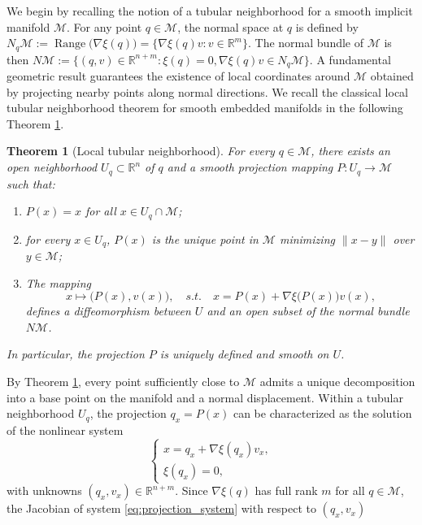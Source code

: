 \documentclass[12pt]{article}
\newtheorem{theorem}{Theorem}[section]
\begin{document}
We begin by recalling the notion of a tubular neighborhood for a smooth implicit
manifold $\mathcal{M}$.
For any point $q \in \mathcal{M}$, the normal space at $q$ is defined by
\(
N_q \mathcal{M}
:= \operatorname{Range}\bigl(\nabla \xi(q)\bigr)
= \{ \nabla \xi(q) v : v \in \mathbb{R}^m \}.
\)
The normal bundle of $\mathcal{M}$ is then
\(
N \mathcal{M}
:= \{ (q, v) \in \mathbb{R}^{n+m} : \xi(q) = 0,\nabla\xi(q)v \in N_q \mathcal{M} \}.
\)
A fundamental geometric result guarantees the existence of local coordinates
around $\mathcal{M}$ obtained by projecting nearby points along normal directions.
We recall the classical local tubular neighborhood theorem \citep{J19} for smooth embedded
manifolds in the following Theorem \ref{thm:tubular_local}.
\begin{theorem}[Local tubular neighborhood]
\label{thm:tubular_local}
For every $q \in \mathcal{M}$, there exists an open neighborhood
$U_q \subset \mathbb{R}^n$ of $q$ and a smooth projection mapping
\(
P : U_q \to \mathcal{M}
\)
such that:
\begin{enumerate}
    \item[(i)] $P(x) = x$ for all $x \in U_q \cap \mathcal{M}$;
    \item[(ii)] for every $x \in U_q$, $P(x)$ is the unique point in $\mathcal{M}$ minimizing
    $\|x - y\|$ over $y \in \mathcal{M}$;
    \item[(iii)]  The mapping
\[
x \longmapsto \bigl(P(x), v(x)\bigr),
\quad s.t. \quad x=P(x)+\nabla\xi\bigl(P(x)\bigr)v(x) 
,
\]
    defines a diffeomorphism between $U$ and an open subset of the normal bundle
    $N \mathcal{M}$.
\end{enumerate}
In particular, the projection $P$ is uniquely defined and smooth on $U$.
\end{theorem}
By Theorem \ref{thm:tubular_local}, every point sufficiently close to $\mathcal{M}$ admits a unique
decomposition into a base point on the manifold and a normal displacement.
Within a tubular neighborhood $U_q$, the projection $q_x = P(x)$ can be characterized
as the solution of the nonlinear system
\begin{equation}
\label{eq:projection_system}
\begin{cases}
x  = q_x + \nabla \xi(q_x) v_x, \\
\xi(q_x) = 0,
\end{cases}
\end{equation}
with unknowns $(q_x,v_x) \in \mathbb{R}^{n+m}$.
Since $\nabla\xi(q)$ has full rank $m$ for all $q\in\mathcal M$, 
the Jacobian of system \eqref{eq:projection_system} with respect to $(q_x,v_x)$ 
\end{document}
